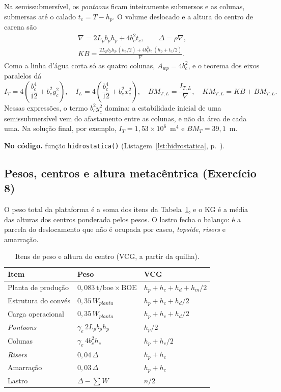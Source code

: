 \documentclass[11pt,a4paper]{article}
\newcommand{\notacodigo}[1]{\begin{nocodigo}\textbf{\sffamily\color{azul}No código.} #1\end{nocodigo}}
\newcommand{\lst}[1]{Listagem~\ref{lst:#1}, p.~\pageref{lst:#1}}
\begin{document}
Na semissubmersível, os \emph{pontoons} ficam inteiramente submersos e as colunas, submersas até
o calado $t_c = T - h_p$. O volume deslocado e a altura do centro de carena são
\begin{gather}
\nabla = 2 L_p b_p h_p + 4 b_c^2 t_c, \qquad \Delta = \rho \nabla, \\
KB = \frac{2 L_p b_p h_p \, (h_p/2) + 4 b_c^2 t_c \, (h_p + t_c/2)}{\nabla} .
\end{gather}
Como a linha d'água corta só as quatro colunas, $A_{wp} = 4b_c^2$, e o teorema dos eixos paralelos
dá
\begin{equation}
I_T = 4\left(\frac{b_c^4}{12} + b_c^2 y_c^2\right), \quad
I_L = 4\left(\frac{b_c^4}{12} + b_c^2 x_c^2\right), \quad
BM_{T,L} = \frac{I_{T,L}}{\nabla}, \quad KM_{T,L} = KB + BM_{T,L} .
\end{equation}
Nessas expressões, o termo $b_c^2 y_c^2$ domina: a estabilidade inicial de uma semissubmersível
vem do afastamento entre as colunas, e não da área de cada uma. Na solução final, por exemplo,
$I_T = 1{,}53\times 10^6$~m$^4$ e $BM_T = 39{,}1$~m.

\notacodigo{função \texttt{hidrostatica()} (\lst{hidrostatica}).}

\subsection{Pesos, centros e altura metacêntrica (Exercício 8)}\label{sec:pesos}

O peso total da plataforma é a soma dos itens da Tabela~\ref{tab:itenspeso}, e o KG é a média das
alturas dos centros ponderada pelos pesos. O lastro fecha o balanço: é a parcela do deslocamento
que não é ocupada por casco, \emph{topside}, \emph{risers} e amarração.

\begin{table}[!htb]
\centering
\caption{Itens de peso e altura do centro (VCG, a partir da quilha).}\label{tab:itenspeso}
\begin{tabular}{lll}
\toprule
Item & Peso & VCG \\
\midrule
Planta de produção & $0{,}083~\text{t/boe} \times \text{BOE}$ & $h_p + h_c + h_d + h_m/2$ \\
Estrutura do convés & $0{,}35\, W_{planta}$ & $h_p + h_c + h_d/2$ \\
Carga operacional & $0{,}35\, W_{planta}$ & $h_p + h_c + h_d/2$ \\
\emph{Pontoons} & $\gamma_e \, 2 L_p b_p h_p$ & $h_p/2$ \\
Colunas & $\gamma_e \, 4 b_c^2 h_c$ & $h_p + h_c/2$ \\
\emph{Risers} & $0{,}04\, \Delta$ & $h_p + h_c$ \\
Amarração & $0{,}03\, \Delta$ & $h_p + h_c$ \\
Lastro & $\Delta - \sum W$ & $n/2$ \\
\bottomrule
\end{tabular}
\end{table}
\end{document}
